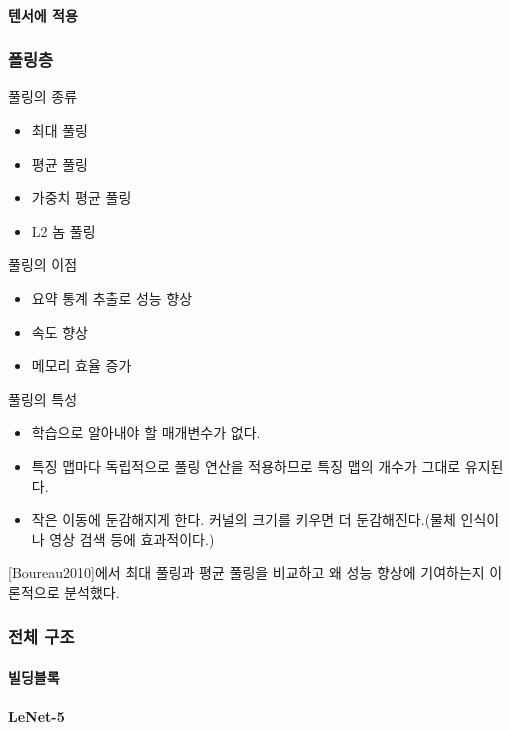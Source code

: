\documentclass [12pt] {oblivoir}
\let\oldsubsubsection=\subsubsection
\renewcommand{\subsubsection}
{
  \filbreak
  \oldsubsubsection
}
\begin{document}
\vspace{3mm}

\paragraph*{텐서에 적용}\mbox{}

\vspace{3mm}

\subsubsection{폴링층}
풀링의 종류
\begin{itemize}
  \item 최대 풀링
  \item 평균 풀링
  \item 가중치 평균 풀링
  \item L2 놈 풀링
\end{itemize}

풀링의 이점
\begin{itemize}
  \item 요약 통계 추출로 성능 향상
  \item 속도 향상
  \item 메모리 효율 증가
\end{itemize}

풀링의 특성
\begin{itemize}
  \item 학습으로 알아내야 할 매개변수가 없다.
  \item 특징 맵마다 독립적으로 풀링 연산을 적용하므로 특징 맵의 개수가 그대로 유지된다.
  \item 작은 이동에 둔감해지게 한다. 커널의 크기를 키우면 더 둔감해진다.(물체 인식이나 영상 검색 등에 효과적이다.)
\end{itemize}

[Boureau2010]에서 최대 풀링과 평균 풀링을 비교하고 왜 성능 향상에 기여하는지 이론적으로 분석했다.

\subsubsection{전체 구조}

\paragraph*{빌딩블록}\mbox{}

\vspace{3mm}

\paragraph*{LeNet-5}\mbox{}
\end{document}
